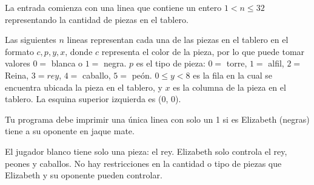 \documentclass{oci}
\begin{document}
\begin{inputDescription}
    La entrada comienza con una linea que contiene un entero $ 1 < n
    \leq 32$ representando la cantidad de piezas en el tablero.

    Las siguientes $n$ lineas representan cada una de las piezas en el
    tablero en el formato $c, p, y, x$, donde $c$ representa el color
    de la pieza, por lo que puede tomar valores $0 = $ blanca o $1
    = $ negra. $p$ es el tipo de pieza: $0 =$ torre, $1 = $ alfil, $2
    = $ Reina, $3 = rey$, $4 = $ caballo, $5 = $ peón. $0 \leq y < 8$ es la fila en
    la cual se encuentra ubicada la pieza en el tablero, y $x$ es la
    columna de la pieza en el tablero. La esquina superior izquierda
    es (0, 0).
\end{inputDescription}

\begin{outputDescription}
    Tu programa debe imprimir una única linea con solo un 1 si es
    Elizabeth (negras) tiene a su oponente en jaque mate.
\end{outputDescription}

\begin{scoreDescription}
  El jugador blanco tiene solo una pieza: el rey.
  Elizabeth solo controla el rey, peones y caballos.
  No hay restricciones en la cantidad o tipo de piezas que Elizabeth y
  su oponente pueden controlar.
\end{scoreDescription}

\begin{sampleDescription}
\end{sampleDescription}
\end{document}
